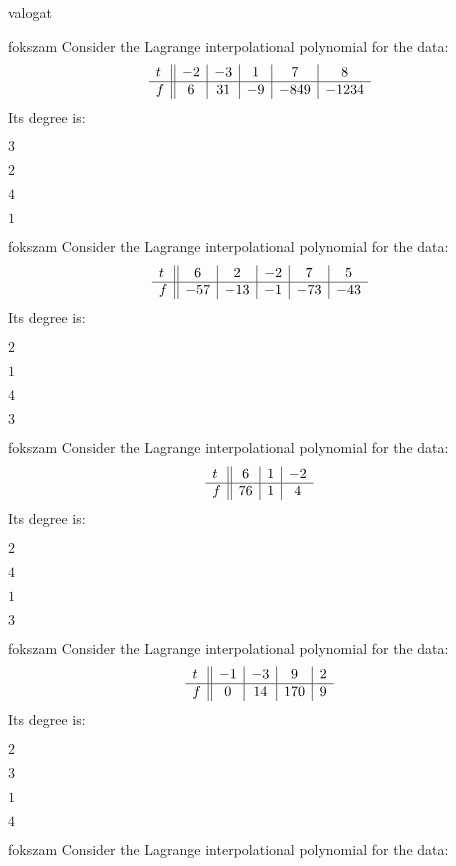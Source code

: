 \documentclass[12pt]{article}
\begin{document}
\begin{quiz}{valogat}
\begin{multi}{fokszam}
Consider the Lagrange interpolational polynomial for the data:
$$\begin{array}{l ||c|c|c|c|c}t&-2&-3&1&7&8\\ \hline f&6&31&-9&-849&-1234 \\ \end{array}$$
Its degree is:
\item* $ 3 $
\item  $ 2 $
\item  $ 4 $
\item  $ 1 $
\end{multi}
\begin{multi}{fokszam}
Consider the Lagrange interpolational polynomial for the data:
$$\begin{array}{l ||c|c|c|c|c}t&6&2&-2&7&5\\ \hline f&-57&-13&-1&-73&-43 \\ \end{array}$$
Its degree is:
\item* $ 2 $
\item  $ 1 $
\item  $ 4 $
\item  $ 3 $
\end{multi}
\begin{multi}{fokszam}
Consider the Lagrange interpolational polynomial for the data:
$$\begin{array}{l ||c|c|c}t&6&1&-2\\ \hline f&76&1&4 \\ \end{array}$$
Its degree is:
\item* $ 2 $
\item  $ 4 $
\item  $ 1 $
\item  $ 3 $
\end{multi}
\begin{multi}{fokszam}
Consider the Lagrange interpolational polynomial for the data:
$$\begin{array}{l ||c|c|c|c}t&-1&-3&9&2\\ \hline f&0&14&170&9 \\ \end{array}$$
Its degree is:
\item* $ 2 $
\item  $ 3 $
\item  $ 1 $
\item  $ 4 $
\end{multi}
\begin{multi}{fokszam}
Consider the Lagrange interpolational polynomial for the data:

\end{multi}
\end{quiz}
\end{document}
